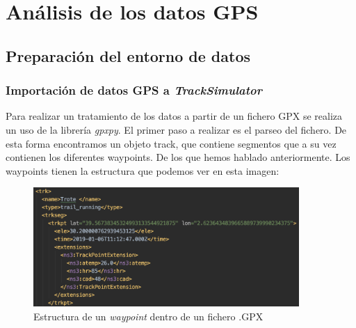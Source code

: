 \chapter{Análisis de los datos \ac{GPS}} 
\section{Preparación del entorno de datos}
\subsection{Importación de datos GPS a \textit{TrackSimulator}}
\label{section: ImportacionGPX}
Para realizar un tratamiento de los datos a partir de un fichero GPX se realiza un uso de la 
librería \textit{gpxpy}. El primer paso a realizar es el parseo del fichero. De esta forma 
encontramos un objeto track, que contiene segmentos que a su vez contienen los diferentes 
waypoints. De los que hemos hablado anteriormente.
Los waypoints tienen la estructura que podemos ver en esta imagen:

\begin{figure}[htb]
\begin{center}
\includegraphics[width=0.9\textwidth]{./Imagenes/WayPointStructure.png}
\caption{Estructura de un \textit{waypoint} dentro de un fichero .\ac{GPX}}
\label{figure: WayPointStructure}
\end{center}
\end{figure}


